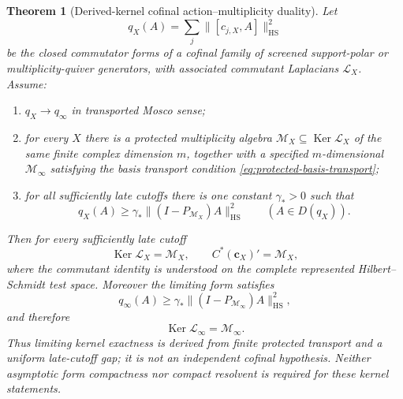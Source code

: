 \documentclass[11pt]{article}
\numberwithin{equation}{section}
\newtheorem{theorem}{Theorem}[section]
\theoremstyle{definition}
\theoremstyle{remark}
\newcommand{\Ker}{\operatorname{Ker}}
\newcommand{\HS}{\mathrm{HS}}
\newcommand{\norm}[1]{\lVert#1\rVert}
\newcommand{\M}{\mathcal M}
\begin{document}
\begin{theorem}[Derived-kernel cofinal action--multiplicity duality]
\label{thm:cofinal-duality}
Let
\begin{equation}
 q_X(A)=\sum_j\norm{[c_{j,X},A]}_{\HS}^2
 \label{eq:cofinal-form}
\end{equation}
be the closed commutator forms of a cofinal family of screened support-polar
or multiplicity-quiver generators, with associated commutant Laplacians
$\mathscr L_X$.  Assume:
\begin{enumerate}[label=\textup{(D\arabic*)},leftmargin=3em]
\item $q_X\to q_\infty$ in transported Mosco sense;
\item for every $X$ there is a protected multiplicity algebra
      $\M_X\subseteq\Ker\mathscr L_X$ of the same finite complex dimension
      $m$, together with a specified $m$-dimensional $\M_\infty$ satisfying
      the basis transport condition
      \eqref{eq:protected-basis-transport};
\item for all sufficiently late cutoffs there is one constant $\gamma_*>0$
      such that
      \begin{equation}
       q_X(A)\ge\gamma_*
       \norm{(I-P_{\M_X})A}_{\HS}^2
       \qquad(A\in D(q_X)).
       \label{eq:uniform-cofinal-gap}
      \end{equation}
\end{enumerate}
Then for every sufficiently late cutoff
\begin{equation}
 \Ker\mathscr L_X=\M_X,\qquad C^*(\bm c_X)'=\M_X,
 \label{eq:cofinal-kernel}
\end{equation}
where the commutant identity is understood on the complete represented
Hilbert--Schmidt test space.  Moreover the limiting form satisfies
\begin{equation}
 q_\infty(A)\ge\gamma_*
 \norm{(I-P_{\M_\infty})A}_{\HS}^2,
 \label{eq:cofinal-limit-gap}
\end{equation}
and therefore
\begin{equation}
 \Ker\mathscr L_\infty=\M_\infty.
 \label{eq:cofinal-limit-kernel}
\end{equation}
Thus limiting kernel exactness is derived from finite protected transport and
a uniform late-cutoff gap; it is not an independent cofinal hypothesis.
Neither asymptotic form compactness nor compact resolvent is required for these
kernel statements.
\end{theorem}
\end{document}
